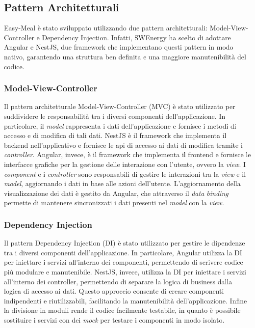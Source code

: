\subsection{Pattern Architetturali}

Easy-Meal è stato sviluppato utilizzando due pattern architetturali:
Model-View-Controller e Dependency Injection. Infatti, SWEnergy ha scelto di
adottare Angular e NestJS, due framework che implementano questi pattern in modo
nativo, garantendo una struttura ben definita e una maggiore manutenibilità del
codice.

\subsubsection{Model-View-Controller}

Il pattern architetturale Model-View-Controller (MVC) è stato utilizzato per
suddividere le responsabilità tra i diversi componenti dell'applicazione. In
particolare, il \textit{model} rappresenta i dati dell'applicazione e fornisce i
metodi di accesso e di modifica di tali dati. NestJS è il framework che
implementa il backend nell'applicativo e fornisce le api di accesso ai dati
di modifica tramite i \textit{controller}. Angular, invece, è il framework che
implementa il frontend e fornisce le interfacce grafiche per la gestione delle
interazione con l'utente, ovvero la \textit{view}. I \textit{component} e i
\textit{controller} sono responsabili di gestire le interazioni tra la 
\textit{view} e il \textit{model},
aggiornando i dati in base alle azioni dell'utente. L'aggiornamento della
visualizzazione dei dati è gestito da Angular, che attraverso il \textit{data
binding} permette di mantenere sincronizzati i dati presenti nel \textit{model}
con la \textit{view}.

\subsubsection{Dependency Injection}

Il pattern Dependency Injection (DI) è stato utilizzato per gestire le
dipendenze tra i diversi componenti dell'applicazione. In particolare, Angular
utilizza la DI per iniettare i servizi all'interno dei componenti, permettendo
di scrivere codice più modulare e manutenibile. NestJS, invece, utilizza la DI
per iniettare i servizi all'interno dei controller, permettendo di separare la
logica di business dalla logica di accesso ai dati. Questo approccio consente di
creare componenti indipendenti e riutilizzabili, facilitando la manutenibilità
dell'applicazione. Infine la divisione in moduli rende il codice facilmente
testabile, in quanto è possibile sostituire i servizi con dei \textit{mock} per
testare i componenti in modo isolato.

